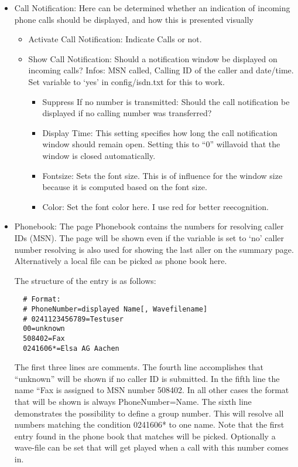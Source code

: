 \begin{itemize}
  \item Call Notification: 
    Here can be determined whether an indication of incoming phone calls
    should be displayed, and how this is presented visually 
    \begin{itemize}
      \item Activate Call Notification: Indicate Calls or not.
      \item Show Call Notification: Should a notification window be displayed on
	incoming calls? Infos: MSN called, Calling ID of the caller and date/time.
        Set variable  to `yes' in config/isdn.txt for this to
        work.
        \begin{itemize}
          \item Suppress If no number is transmitted: Should the call notification 
	    be displayed if no calling number was transferred?
          \item Display Time: This setting specifies how long the call notification
	    window should remain open. Setting this to ``0'' willavoid that the
	    window is closed automatically.
          \item Fontsize: Sets the font size. This is of influence for the window size
	    because it is computed based on the font size.
          \item Color: Set the font color here. I use red for better reecognition.
      \end{itemize}
    \end{itemize}
    

  \item Phonebook: The page Phonebook contains the numbers for resolving caller
    IDs (MSN). The page will be shown even if  the variable  is
    set to `no' caller number resolving is also used for showing the last aller
    on the summary page. Alternatively a local file can be picked as phone book here.

    The structure of the entry is as follows:

\begin{example}
\begin{verbatim}
  # Format:
  # PhoneNumber=displayed Name[, Wavefilename]
  # 0241123456789=Testuser
  00=unknown
  508402=Fax
  0241606*=Elsa AG Aachen
\end{verbatim}
\end{example}

    The first three lines are comments. The fourth line accomplishes that
    ``unknown'' will be shown if no caller ID is submitted. In the fifth
    line the name ``Fax is assigned to MSN number 508402. In all other cases
    the format that will be shown is always PhoneNumber=Name. The sixth
    line demonstrates the possibility to define a group number. This will
    resolve all numbers matching the condition 0241606* to one name. Note
    that the first entry found in the phone book that matches will be picked.
    Optionally a wave-file can be set that will get played when a call with
    this number comes in.


\end{itemize}
